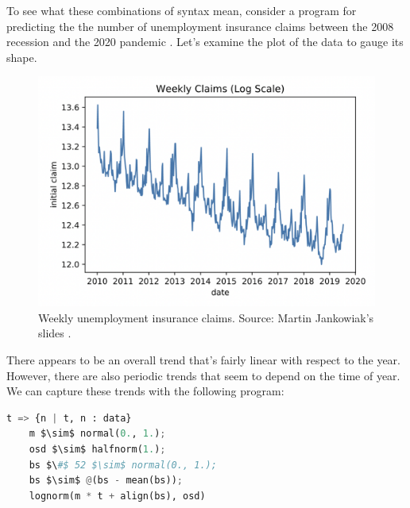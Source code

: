 \documentclass[letterpaper]{llncs}
\begin{document}
To see what these combinations of syntax mean, consider a program
for predicting the the number of unemployment insurance claims 
between the 2008 recession and the 2020 pandemic \cite{plot}.
Let's examine the plot of the data to gauge its shape.
\newline
\begin{figure}
\begin{center}
\includegraphics[scale=0.35]{weekly_claims}
\end{center}

\caption{
Weekly unemployment insurance claims. Source: Martin Jankowiak's slides \cite{plot}.   
}
\end{figure}


There appears to be an overall trend that's fairly linear with respect to the year. 
However, there are also periodic trends that seem to depend on the time of year.  
We can capture these trends with the following program:

\begin{lstlisting}[language=Python]
t => {n | t, n : data}
    m $\sim$ normal(0., 1.); 
    osd $\sim$ halfnorm(1.); 
    bs $\#$ 52 $\sim$ normal(0., 1.); 
    bs $\sim$ @(bs - mean(bs));
    lognorm(m * t + align(bs), osd)
\end{lstlisting}
\end{document}
